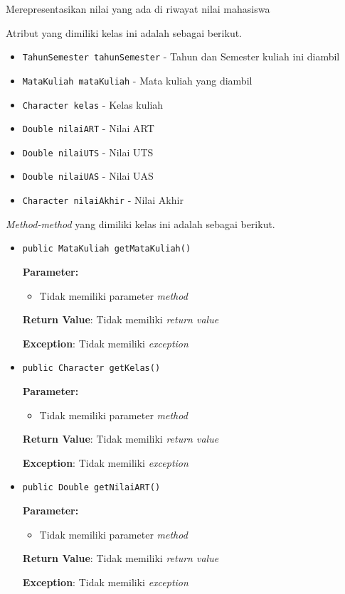 \documentclass{article}
\begin{document}
\begin{enumerate}
Merepresentasikan nilai yang ada di riwayat nilai mahasiswa

Atribut yang dimiliki kelas ini adalah sebagai berikut.
\begin{itemize}
\item \texttt{TahunSemester tahunSemester} - Tahun dan Semester kuliah ini diambil
\item \texttt{MataKuliah mataKuliah} - Mata kuliah yang diambil
\item \texttt{Character kelas} - Kelas kuliah
\item \texttt{Double nilaiART} - Nilai ART
\item \texttt{Double nilaiUTS} - Nilai UTS
\item \texttt{Double nilaiUAS} - Nilai UAS
\item \texttt{Character nilaiAkhir} - Nilai Akhir
\end{itemize}
\textit{Method-method} yang dimiliki kelas ini adalah sebagai berikut.
\begin{itemize}
\item \texttt{public MataKuliah getMataKuliah()}

\textbf{Parameter:}
\begin{itemize}
\item Tidak memiliki parameter \textit{method}
\end{itemize}
\textbf{Return Value}: Tidak memiliki \textit{return value}

\textbf{Exception}: Tidak memiliki \textit{exception}

\item \texttt{public Character getKelas()}

\textbf{Parameter:}
\begin{itemize}
\item Tidak memiliki parameter \textit{method}
\end{itemize}
\textbf{Return Value}: Tidak memiliki \textit{return value}

\textbf{Exception}: Tidak memiliki \textit{exception}

\item \texttt{public Double getNilaiART()}

\textbf{Parameter:}
\begin{itemize}
\item Tidak memiliki parameter \textit{method}
\end{itemize}
\textbf{Return Value}: Tidak memiliki \textit{return value}

\textbf{Exception}: Tidak memiliki \textit{exception}


\end{itemize}
\end{enumerate}
\end{document}
